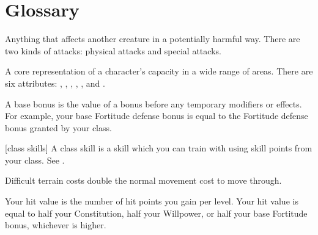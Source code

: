 \chapter{Glossary}\label{Glossary}

 Anything that affects another creature in a potentially harmful way. There are two kinds of attacks: physical attacks and special attacks.

 A core representation of a character's capacity in a wide range of areas. There are six attributes: , , , , , and .

 A base bonus is the value of a bonus before any temporary modifiers or effects. For example, your base Fortitude defense bonus is equal to the Fortitude defense bonus granted by your class.

[class skills] A class skill is a skill which you can train with using skill points from your class. See .

 Difficult terrain costs double the normal movement cost to move through.

 Your hit value is the number of hit points you gain per level. Your hit value is equal to half your Constitution, half your Willpower, or half your base Fortitude bonus, whichever is higher.
